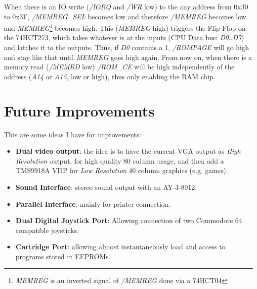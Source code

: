 \documentclass[a4paper,11pt]{article}
\begin{document}
    When there is an IO write (\textit{/IORQ} and \textit{/WR} low) to the any
    address from 0x30 to 0x3F, \textit{/MEMREG\_SEL} becomes low and therefore 
    \textit{/MEMREG} becomes low and \textit{MEMREG}\footnote{\textit{MEMREG} is
    an inverted signal of \textit{/MEMREG} done via a 74HCT04} becomes high. This
    (\textit{MEMREG} high) triggers the Flip-Flop on the 74HCT273, which takes
    whatever is at the inputs (CPU Data bus: \textit{D0}..\textit{D7}) and
    latches it to the outputs. Thus, if \textit{D0} contains a 1,
    \textit{/ROMPAGE} will go high and stay like that until \textit{MEMREG} goes
    high again. From now on, when there is a memory read (\textit{/MEMRD} low)
    \textit{/ROM\_CE} will be high independently of the address (\textit{A14}
    or \textit{A15}, low or high), thus only enabling the RAM chip.

    \pagebreak
    \section{Future Improvements}

    This are some ideas I have for improvements:

    \begin{itemize}
        \item \textbf{Dual video output}: the idea is to have the current VGA
                output as \textit{High Resolution} output, for high quality 
                80 column usage, and then add a TMS9918A VDP for 
                \textit{Low Resolution} 40 column graphics (e.g. games).
        \item \textbf{Sound Interface}: stereo sound output with an AY-3-8912.
        \item \textbf{Parallel Interface}: mainly for printer connection.
        \item \textbf{Dual Digital Joystick Port}: Allowing connection of two
                Commodore 64 compatible joysticks.
        \item \textbf{Cartridge Port}: allowing almost instantaneously load and
        access to programs stored in EEPROMs.
    \end{itemize}
\end{document}
